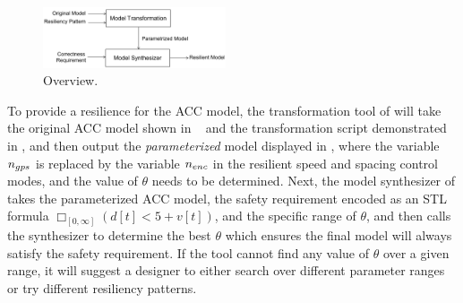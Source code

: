 %
%
%
%
\begin{figure}[t!]%
	\centering%
    \includegraphics[width=0.48\textwidth]{image/overview}%
	\caption{\toolreaffirm Overview.}%
\end{figure}%
%
%

To provide a resilience for the ACC model, the transformation tool of \toolreaffirm will take the original ACC model shown in ~ and the transformation script demonstrated in , and then output the \emph{parameterized} model displayed in , where the variable $n_{gps}$ is replaced by the variable $n_{enc}$ in the resilient speed and spacing control modes, and the value of $\theta$ needs to be determined. Next, the model synthesizer of \toolreaffirm takes the parameterized ACC model, the safety requirement encoded as an STL formula $\Box_{[0, \infty]} (d[t] < 5 + v[t])$, and the specific range of $\theta$, and then calls the synthesizer to determine the best $\theta$ which ensures the final model will always satisfy the safety requirement. If the tool cannot find any value of $\theta$ over a given range, it will suggest a designer to either search over different parameter ranges or try different resiliency patterns.   
%
%

